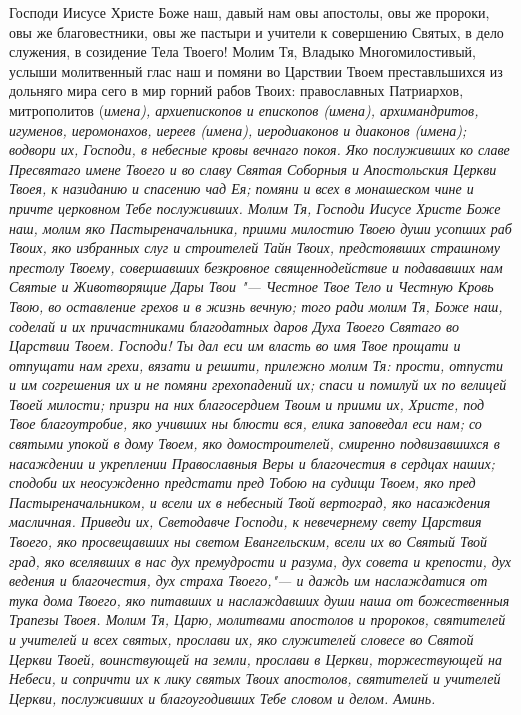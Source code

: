\mychapterending

 


Господи Иисусе Христе Боже наш, давый нам овы апостолы, овы же пророки, овы же благовестники, овы же пастыри и учители к совершению Святых, в дело служения, в созидение Тела Твоего! Молим Тя, Владыко Многомилостивый, услыши молитвенный глас наш и помяни во Царствии Твоем преставльшихся из дольняго мира сего в мир горний рабов Твоих: православных Патриархов, митрополитов (\itshape имена\normalfont{}), архиепископов и епископов (\itshape имена\normalfont{}), архимандритов, игуменов, иеромонахов, иереев (\itshape имена\normalfont{}), иеродиаконов и диаконов (\itshape имена\normalfont{}); водвори их, Господи, в небесные кровы вечнаго покоя. Яко послуживших ко славе Пресвятаго имене Твоего и во славу Святая Соборныя и Апостольския Церкви Твоея, к назиданию и спасению чад Ея; помяни и всех в монашеском чине и причте церковном Тебе послуживших. Молим Тя, Господи Иисусе Христе Боже наш, молим яко Пастыреначальника, приими милостию Твоею души усопших раб Твоих, яко избранных слуг и строителей Тайн Твоих, предстоявших страшному престолу Твоему, совершавших безкровное священнодействие и подававших нам Святые и Животворящие Дары Твои "--- Честное Твое Тело и Честную Кровь Твою, во оставление грехов и в жизнь вечную; того ради молим Тя, Боже наш, соделай и их причастниками благодатных даров Духа Твоего Святаго во Царствии Твоем. Господи! Ты дал еси им власть во имя Твое прощати и отпущати нам грехи, вязати и решити, прилежно молим Тя: прости, отпусти и им согрешения их и не помяни грехопадений их; спаси и помилуй их по велицей Твоей милости; призри на них благосердием Твоим и приими их, Христе, под Твое благоутробие, яко учивших ны блюсти вся, елика заповедал еси нам; со святыми упокой в дому Твоем, яко домостроителей, смиренно подвизавшихся в насаждении и укреплении Православныя Веры и благочестия в сердцах наших; сподоби их неосужденно предстати пред Тобою на судищи Твоем, яко пред Пастыреначальником, и всели их в небесный Твой вертоград, яко насаждения масличная. Приведи их, Светодавче Господи, к невечернему свету Царствия Твоего, яко просвещавших ны светом Евангельским, всели их во Святый Твой град, яко вселявших в нас дух премудрости и разума, дух совета и крепости, дух ведения и благочестия, дух страха Твоего,"--- и даждь им наслаждатися от тука дома Твоего, яко питавших и наслаждавших души наша от божественныя Трапезы Твоея. Молим Тя, Царю, молитвами апостолов и пророков, святителей и учителей и всех святых, прослави их, яко служителей словесе во Святой Церкви Твоей, воинствующей на земли, прослави в Церкви, торжествующей на Небеси, и сопричти их к лику святых Твоих апостолов, святителей и учителей Церкви, послуживших и благоугодивших Тебе словом и делом. Аминь. 
\mychapterending

